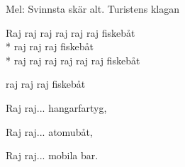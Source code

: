 \begin{SongText}[Fiskebåt]
    \begin{SongInfo}
        Mel: Svinnsta skär alt. Turistens klagan
    \end{SongInfo}
    \begin{SongVerse}
        Raj raj raj raj raj raj fiskebåt\\*%
        raj raj raj fiskebåt\\*%
        raj raj raj raj raj raj fiskebåt
    \end{SongVerse}
    \begin{SongVerse}
        raj raj raj fiskebåt
    \end{SongVerse}
    \begin{SongVerse}
        Raj raj... hangarfartyg,
    \end{SongVerse}
    \begin{SongVerse}
        Raj raj... atomubåt,
    \end{SongVerse}
    \begin{SongVerse}
        Raj raj... mobila bar.
    \end{SongVerse}
\end{SongText}
